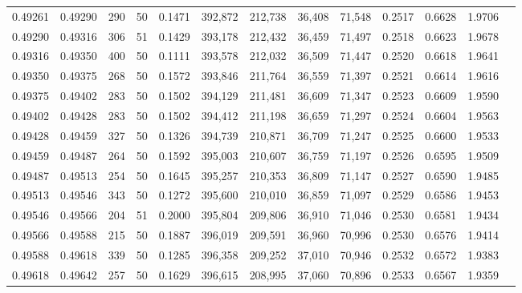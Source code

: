 \begin{tabular}{rrrrrrrrrrrrr}
0.49261 & 0.49290 &   290 &  50 &                                     0.1471 & 392,872 & 212,738 &  36,408 &  71,548 & 0.2517 & 0.6628 & 1.9706 \\
0.49290 & 0.49316 &   306 &  51 &                                     0.1429 & 393,178 & 212,432 &  36,459 &  71,497 & 0.2518 & 0.6623 & 1.9678 \\
0.49316 & 0.49350 &   400 &  50 &                                     0.1111 & 393,578 & 212,032 &  36,509 &  71,447 & 0.2520 & 0.6618 & 1.9641 \\
0.49350 & 0.49375 &   268 &  50 &                                     0.1572 & 393,846 & 211,764 &  36,559 &  71,397 & 0.2521 & 0.6614 & 1.9616 \\
0.49375 & 0.49402 &   283 &  50 &                                     0.1502 & 394,129 & 211,481 &  36,609 &  71,347 & 0.2523 & 0.6609 & 1.9590 \\
0.49402 & 0.49428 &   283 &  50 &                                     0.1502 & 394,412 & 211,198 &  36,659 &  71,297 & 0.2524 & 0.6604 & 1.9563 \\
0.49428 & 0.49459 &   327 &  50 &                                     0.1326 & 394,739 & 210,871 &  36,709 &  71,247 & 0.2525 & 0.6600 & 1.9533 \\
0.49459 & 0.49487 &   264 &  50 &                                     0.1592 & 395,003 & 210,607 &  36,759 &  71,197 & 0.2526 & 0.6595 & 1.9509 \\
0.49487 & 0.49513 &   254 &  50 &                                     0.1645 & 395,257 & 210,353 &  36,809 &  71,147 & 0.2527 & 0.6590 & 1.9485 \\
0.49513 & 0.49546 &   343 &  50 &                                     0.1272 & 395,600 & 210,010 &  36,859 &  71,097 & 0.2529 & 0.6586 & 1.9453 \\
0.49546 & 0.49566 &   204 &  51 &                                     0.2000 & 395,804 & 209,806 &  36,910 &  71,046 & 0.2530 & 0.6581 & 1.9434 \\
0.49566 & 0.49588 &   215 &  50 &                                     0.1887 & 396,019 & 209,591 &  36,960 &  70,996 & 0.2530 & 0.6576 & 1.9414 \\
0.49588 & 0.49618 &   339 &  50 &                                     0.1285 & 396,358 & 209,252 &  37,010 &  70,946 & 0.2532 & 0.6572 & 1.9383 \\
0.49618 & 0.49642 &   257 &  50 &                                     0.1629 & 396,615 & 208,995 &  37,060 &  70,896 & 0.2533 & 0.6567 & 1.9359 \\

\end{tabular}

